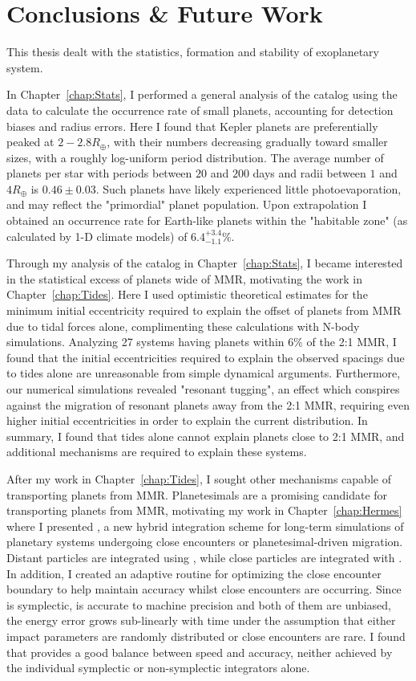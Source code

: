 \chapter{Conclusions \& Future Work}
This thesis dealt with the statistics, formation and stability of exoplanetary system. 

In Chapter~\ref{chap:Stats}, I performed a general analysis of the \kep catalog using the \citet{Ramirez2014} data to calculate the occurrence rate of small planets, accounting for detection biases and radius errors. 
Here I found that Kepler planets are preferentially peaked at $2-2.8R_\oplus$, with their numbers decreasing gradually toward smaller sizes, with a roughly log-uniform period distribution.
The average number of planets per star with periods between $20$ and $200$ days and radii between $1$ and $4R_\oplus$ is $0.46 \pm 0.03$. 
Such planets have likely experienced little photoevaporation, and may reflect the "primordial" planet population. 
Upon extrapolation I obtained an occurrence rate for Earth-like planets within the "habitable zone" (as calculated by 1-D climate models) of $6.4^{+3.4}_{-1.1}\%$. 

Through my analysis of the \kep catalog in Chapter~\ref{chap:Stats}, I became interested in the statistical excess of planets wide of MMR, motivating the work in Chapter~\ref{chap:Tides}.
Here I used optimistic theoretical estimates for the minimum initial eccentricity required to explain the offset of \kep planets from MMR due to tidal forces alone, complimenting these calculations with N-body simulations.
Analyzing 27 \kep systems having planets within $6\%$ of the 2:1 MMR, I found that the initial eccentricities required to explain the observed spacings due to tides alone are unreasonable from simple dynamical arguments.
Furthermore, our numerical simulations revealed "resonant tugging", an effect which conspires against the migration of resonant planets away from the 2:1 MMR, requiring even higher initial eccentricities in order to explain the current \kep distribution. 
In summary, I found that tides alone cannot explain planets close to 2:1 MMR, and additional mechanisms are required to explain these systems. 

After my work in Chapter~\ref{chap:Tides}, I sought other mechanisms capable of transporting planets from MMR. 
Planetesimals are a promising candidate for transporting planets from MMR, motivating my work in Chapter~\ref{chap:Hermes} where I presented \hermes, a new hybrid integration scheme for long-term simulations of planetary systems undergoing close encounters or planetesimal-driven migration. 
Distant particles are integrated using \whfast, while close particles are integrated with \ias.
In addition, I created an adaptive routine for optimizing the close encounter boundary to help maintain accuracy whilst close encounters are occurring.
Since \whfast is symplectic, \ias is accurate to machine precision and both of them are unbiased, the energy error grows sub-linearly with time under the assumption that either impact parameters are randomly distributed or close encounters are rare.
I found that \hermes provides a good balance between speed and accuracy, neither achieved by the individual symplectic or non-symplectic integrators alone.

